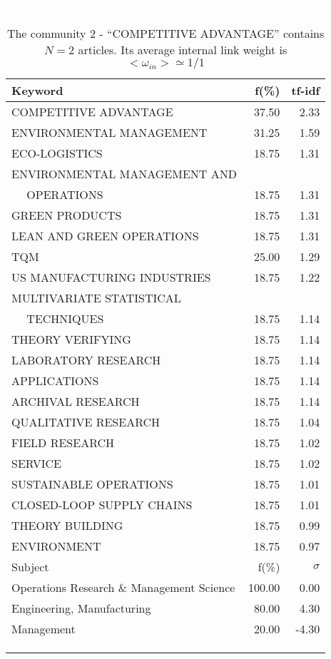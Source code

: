 \documentclass[a4paper,11pt]{report}
\begin{document}
\begin{landscape}
\clearpage

\begin{table}[!ht]
\caption{The community 2 - ``COMPETITIVE ADVANTAGE'' contains $N = 2$ articles. Its average internal link weight is $<\omega_{in}> \simeq 1/1$ }
\textcolor{white}{aa}\\
{\scriptsize\begin{tabular}{|l r  r|}
\hline
Keyword & f(\%) & tf-idf \\
\hline
COMPETITIVE ADVANTAGE & 37.50 & 2.33\\
ENVIRONMENTAL MANAGEMENT & 31.25 & 1.59\\
ECO-LOGISTICS & 18.75 & 1.31\\
ENVIRONMENTAL MANAGEMENT AND &  &\\
$\quad$ OPERATIONS & 18.75 & 1.31\\
GREEN PRODUCTS & 18.75 & 1.31\\
LEAN AND GREEN OPERATIONS & 18.75 & 1.31\\
TQM & 25.00 & 1.29\\
US MANUFACTURING INDUSTRIES & 18.75 & 1.22\\
MULTIVARIATE STATISTICAL &  &\\
$\quad$ TECHNIQUES & 18.75 & 1.14\\
THEORY VERIFYING & 18.75 & 1.14\\
LABORATORY RESEARCH & 18.75 & 1.14\\
APPLICATIONS & 18.75 & 1.14\\
ARCHIVAL RESEARCH & 18.75 & 1.14\\
QUALITATIVE RESEARCH & 18.75 & 1.04\\
FIELD RESEARCH & 18.75 & 1.02\\
SERVICE & 18.75 & 1.02\\
SUSTAINABLE OPERATIONS & 18.75 & 1.01\\
CLOSED-LOOP SUPPLY CHAINS & 18.75 & 1.01\\
THEORY BUILDING & 18.75 & 0.99\\
ENVIRONMENT & 18.75 & 0.97\\
\hline
\hline
Subject & f(\%) & $\sigma$\\
\hline
Operations Research \& Management Science & 100.00 & 0.00\\
Engineering, Manufacturing & 80.00 & 4.30\\
Management & 20.00 & -4.30\\
 &  & \\
 &  & \\
 &  & \\

\end{tabular}}
\end{table}
\end{landscape}
\end{document}
